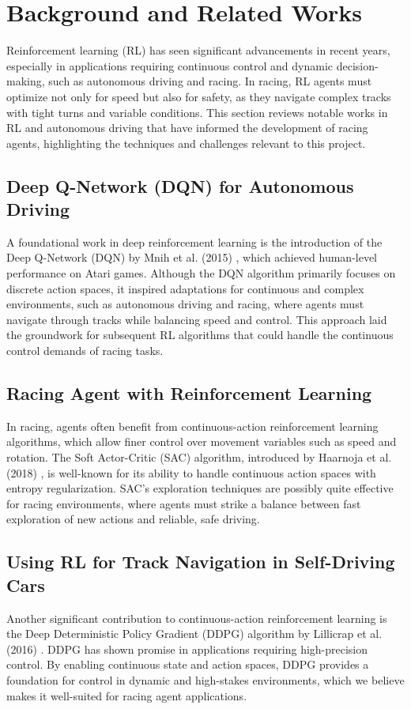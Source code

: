 \documentclass{article}
\begin{document}
\section{Background and Related Works}

Reinforcement learning (RL) has seen significant advancements in recent years, especially in applications requiring continuous control and dynamic decision-making, such as autonomous driving and racing. In racing, RL agents must optimize not only for speed but also for safety, as they navigate complex tracks with tight turns and variable conditions. This section reviews notable works in RL and autonomous driving that have informed the development of racing agents, highlighting the techniques and challenges relevant to this project.

\subsection{Deep Q-Network (DQN) for Autonomous Driving}
A foundational work in deep reinforcement learning is the introduction of the Deep Q-Network (DQN) by Mnih et al. (2015) \cite{mnih2015human}, which achieved human-level performance on Atari games. Although the DQN algorithm primarily focuses on discrete action spaces, it inspired adaptations for continuous and complex environments, such as autonomous driving and racing, where agents must navigate through tracks while balancing speed and control. This approach laid the groundwork for subsequent RL algorithms that could handle the continuous control demands of racing tasks.

\subsection{Racing Agent with Reinforcement Learning}
In racing, agents often benefit from continuous-action reinforcement learning algorithms, which allow finer control over movement variables such as speed and rotation. The Soft Actor-Critic (SAC) algorithm, introduced by Haarnoja et al. (2018) \cite{haarnoja2018soft}, is well-known for its ability to handle continuous action spaces with entropy regularization. SAC’s exploration techniques are possibly quite effective for racing environments, where agents must strike a balance between fast exploration of new actions and reliable, safe driving.

\subsection{Using RL for Track Navigation in Self-Driving Cars}
Another significant contribution to continuous-action reinforcement learning is the Deep Deterministic Policy Gradient (DDPG) algorithm by Lillicrap et al. (2016) \cite{lillicrap2015continuous}. DDPG has shown promise in applications requiring high-precision control. By enabling continuous state and action spaces, DDPG provides a foundation for control in dynamic and high-stakes environments, which we believe makes it well-suited for racing agent applications.
\end{document}
